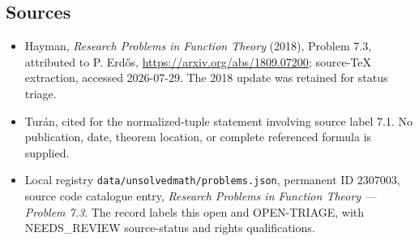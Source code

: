 \documentclass[11pt]{article}
\begin{document}
\subsection{Sources}
\begin{itemize}
\item Hayman, \emph{Research Problems in Function Theory} (2018), Problem 7.3, attributed to P. Erd\H{o}s, \url{https://arxiv.org/abs/1809.07200}; source-TeX extraction, accessed 2026-07-29. The 2018 update was retained for status triage.
\item Tur\'an, cited for the normalized-tuple statement involving source label 7.1. No publication, date, theorem location, or complete referenced formula is supplied.
\item Local registry \texttt{data/unsolvedmath/problems.json}, permanent ID $2307003$, source code catalogue entry, \emph{Research Problems in Function Theory --- Problem 7.3}. The record labels this open and OPEN-TRIAGE, with NEEDS\_REVIEW source-status and rights qualifications.
\end{itemize}
\end{document}
